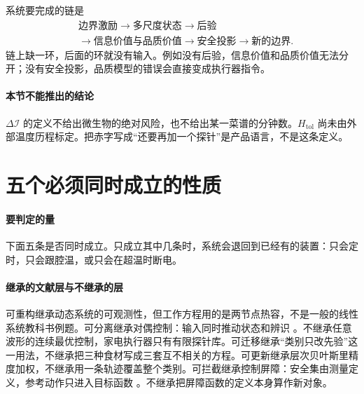 系统要完成的链是
\begin{equation}
\begin{aligned}
&\text{边界激励}\to\text{多尺度状态}\to\text{后验}\\
&\to\text{信息价值与品质价值}\to\text{安全投影}\to\text{新的边界}.
\end{aligned}
\end{equation}
链上缺一环，后面的环就没有输入。例如没有后验，信息价值和品质价值无法分开；没有安全投影，品质模型的错误会直接变成执行器指令。

\paragraph{本节不能推出的结论}
\(\Delta\mathcal{I}\) 的定义不给出微生物的绝对风险，也不给出某一菜谱的分钟数。\(H_{\mathrm{tol}}\) 尚未由外部温度历程标定。把赤字写成“还要再加一个探针”是产品语言，不是这条定义。

\section{五个必须同时成立的性质}

\paragraph{要判定的量}
下面五条是否同时成立。只成立其中几条时，系统会退回到已经有的装置：只会定时，只会跟腔温，或只会在超温时断电。

\paragraph{继承的文献层与不继承的层}
可重构继承动态系统的可观测性，但工作方程用的是两节点热容，不是一般的线性系统教科书例题。可分离继承对偶控制：输入同时推动状态和辨识 \cite{feldbaum1965}。不继承任意波形的连续最优控制，家电执行器只有有限探针库。可迁移继承“类别只改先验”这一用法，不继承把三种食材写成三套互不相关的方程。可更新继承层次贝叶斯里精度加权，不继承用一条轨迹覆盖整个类别。可拦截继承控制屏障：安全集由测量定义，参考动作只进入目标函数 \cite{ames2017cbf}。不继承把屏障函数的定义本身算作新对象。

